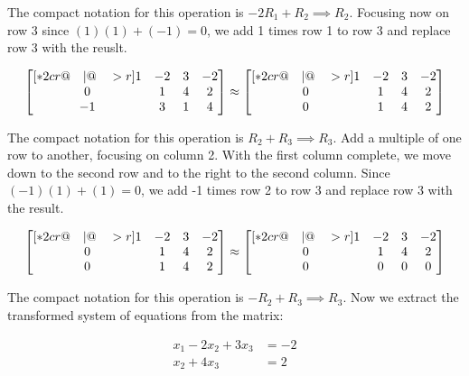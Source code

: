         The compact notation for this operation is $-2R_1 + R_2 \implies R_2$. Focusing now on row 3 since $(1)(1)+(-1)=0$, we add 1 times row 1 to row 3 and replace row 3 with the reuslt.

        \[
            \begin{bmatrix}[*2cr@{\quad}|@{\quad}>{\color{red}}r]
                1   & -2    & 3     & -2 \\
                0   & 1     & 4     & 2 \\
                -1  & 3     & 1     & 4
            \end{bmatrix}
            \approx
            \begin{bmatrix}[*2cr@{\quad}|@{\quad}>{\color{red}}r]
                1   & -2    & 3     & -2 \\
                0   & 1     & 4     & 2 \\
                0   & 1     & 4     & 2
            \end{bmatrix}
        \]

        The compact notation for this operation is $R_2 + R_3 \implies R_3$. Add a multiple of one row to another, focusing on column 2. With the first column complete, we move down to the second row and to the right
        to the second column. Since $(-1)(1)+(1)=0$, we add -1 times row 2 to row 3 and replace row 3 with the result.

        \[
            \begin{bmatrix}[*2cr@{\quad}|@{\quad}>{\color{red}}r]
                1   & -2    & 3     & -2 \\
                0   & 1     & 4     & 2 \\
                0   & 1     & 4     & 2
            \end{bmatrix}
            \approx
            \begin{bmatrix}[*2cr@{\quad}|@{\quad}>{\color{red}}r]
                1   & -2    & 3     & -2 \\
                0   & 1     & 4     & 2 \\
                0   & 0     & 0     & 0
            \end{bmatrix}
        \]

        The compact notation for this operation is $-R_2 + R_3 \implies R_3$. Now we extract the transformed system of equations from the matrix:

        \begin{align*}
            x_1 - 2x_2 + 3x_3   &= -2 \\
            x_2 + 4x_3          &= 2
        \end{align*}

